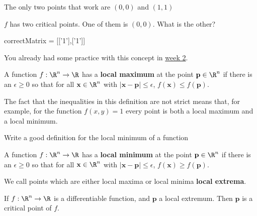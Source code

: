 \documentclass{ximera}
\begin{document}
\begin{question}
\begin{solution}
			\begin{hint}
				The only two points that work are $(0,0)$ and $(1,1)$
			\end{hint}
			$f$ has two critical points.  One of them is $(0,0)$.  What is the other?
			\begin{matrix-answer}
				correctMatrix = [['1'],['1']]
			\end{matrix-answer}
		\end{solution}
	\end{question}
	
	You already had some practice with this concept in \href{http://ximera.osu.edu/course/kisonecat/m2o2c2/course/activity/week2/practice/stationary-points/}{week 2}.
	
	\begin{definition}
		A function $f:\R^n \to \R$ has a \textbf{local maximum} at the point $\mathbf{p} \in \R^n$ if there is an $\epsilon \geq 0$ so that for all $\mathbf{x} \in \R^n$
		with $|\mathbf{x} - \mathbf{p}| \leq \epsilon$, $f(\mathbf{x}) \leq f(\mathbf{p})$.
	\end{definition}
	
	\begin{warning}
		The fact that the inequalities in this definition are not strict means that, for example, for the function $f(x,y) = 1$ every point is both a local maximum and a local minimum.
	\end{warning}
	
	Write a good definition for the local minimum of a function
	\begin{free-response}
		A function $f:\R^n \to \R$ has a \textbf{local minimum} at the point $\mathbf{p} \in \R^n$ if there is an $\epsilon \geq 0$ so that for all $\mathbf{x} \in \R^n$
		with $|\mathbf{x} - \mathbf{p}| \leq \epsilon$, $f(\mathbf{x}) \geq f(\mathbf{p})$.
	\end{free-response}
		
	We call points which are either local maxima or local minima \textbf{local extrema}.
		
	\begin{theorem}
		If $f:\R^n \to \R$ is a differentiable function, and $\mathbf{p}$ a local extremum.  Then $\mathbf{p}$ is a critical point of $f$.
	\end{theorem}
	
\end{document}
